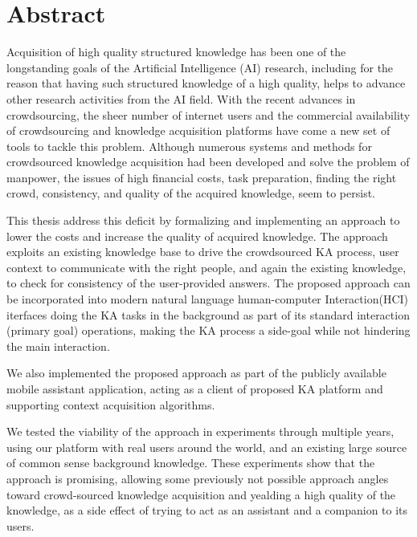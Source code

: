 % 
\chapter*{Abstract}
Acquisition of high quality structured knowledge has been one of the 
longstanding goals of the Artificial Intelligence (AI) research, including for 
the reason that having such structured knowledge of a high quality, helps to 
advance other research activities from the AI field. With the recent advances 
in crowdsourcing, the sheer number of internet users and the commercial 
availability of crowdsourcing and knowledge acquisition platforms have come a 
new set of tools to tackle this problem. Although numerous systems and methods 
for crowdsourced knowledge acquisition had been developed and solve the problem
of manpower, the issues of high financial costs, task preparation, finding 
the right crowd, consistency, and quality of the acquired knowledge, seem to 
persist. 

This thesis address this deficit by formalizing and implementing an approach
to lower the costs and increase the quality of acquired knowledge. The approach
exploits an existing knowledge base to drive the crowdsourced KA process, 
user context to communicate with the right people, and again the existing
knowledge, to check for consistency of the user-provided answers. 
The proposed approach can be incorporated into modern natural language
human-computer Interaction(HCI) iterfaces doing the KA tasks in the background
as part of its standard interaction (primary goal) operations, making the KA
process a side-goal while not hindering the main interaction. 

We also implemented the proposed approach as part of the publicly available 
mobile assistant application, acting as a client of proposed KA platform and 
supporting context acquisition algorithms.

We tested the viability of the approach in experiments through multiple years,
using our platform with real users around the world, and an existing large 
source of common sense background knowledge. These experiments show that the 
approach is promising, allowing some previously not possible approach angles 
toward crowd-sourced knowledge acquisition and yealding a high quality of the 
knowledge, as a side effect of trying to act as an assistant and a companion 
to its users.
